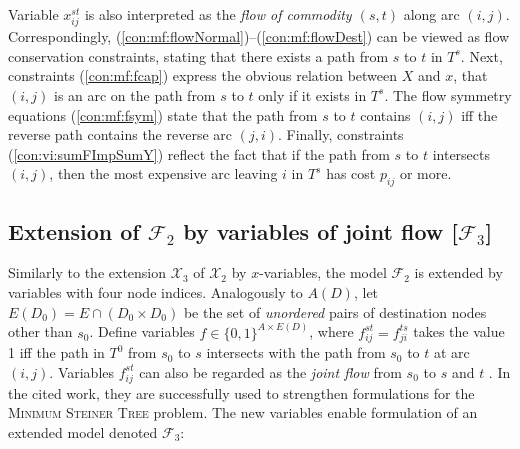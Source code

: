 Variable $x_{ij}^{st}$ is also interpreted as the \emph{flow of commodity $(s,t)$} along arc $(i,j)$.
Correspondingly, (\ref{con:mf:flowNormal})--(\ref{con:mf:flowDest}) can be viewed as flow conservation constraints,
stating that there exists a path from $s$ to $t$ in $T^s$.
Next, constraints (\ref{con:mf:fcap}) express the obvious relation between $X$ and $x$, that $(i,j)$ is an arc on the path from $s$ to $t$ only if it exists in $T^s$.
The flow symmetry equations (\ref{con:mf:fsym}) state that the path from $s$ to $t$ contains $(i,j)$ iff the reverse path contains the reverse arc $(j,i)$.
Finally, constraints (\ref{con:vi:sumFImpSumY}) reflect the fact that if the path from $s$ to $t$ intersects $(i,j)$,
then the most expensive arc leaving $i$ in $T^s$ has cost $p_{ij}$ or more.


\subsection{Extension of $\mathcal{F}_2$ by variables of joint flow [$\mathcal{F}_3$]}

Similarly to the extension $\mathcal{X}_3$ of $\mathcal{X}_2$ by $x$-variables, the model $\mathcal{F}_2$ is extended by variables with four node indices.
Analogously to $A(D)$, let $E(D_0)=E\cap (D_0\times D_0)$ be the set of \emph{unordered} pairs of destination nodes other than $s_0$.
Define variables $f\in\{0,1\}^{A\times E(D)}$, where
$f_{ij}^{st}=f_{ji}^{ts}$ takes the value 1 iff the path in $T^0$ from $s_0$ to $s$ intersects with the path from $s_0$ to $t$ at arc $(i,j)$.
%
Variables $f_{ij}^{st}$ can also be regarded as the \emph{joint flow} from $s_0$ to $s$ and $t$ \citep{Polzin}.
In the cited work, they are successfully used to strengthen formulations for the \textsc{Minimum Steiner Tree} problem.
The new variables enable formulation of an extended model denoted $\mathcal{F}_3$: 

